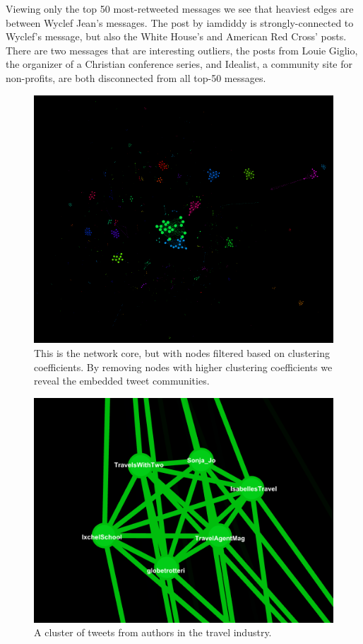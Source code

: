 \documentclass[a4paper, 11pt, titlepage]{article}
\begin{document}
Viewing only the top 50 most-retweeted messages we see that heaviest edges are between Wyclef Jean's messages.  The post by iamdiddy is strongly-connected to Wyclef's message, but also the White House's and American Red Cross' posts.  There are two messages that are interesting outliers, the posts from Louie Giglio, the organizer of a Christian conference series, and Idealist, a community site for non-profits, are both disconnected from all top-50 messages.

\begin{figure}[h]
\centering
\label{fig:rt_net_core_clusters}
\includegraphics[width=120mm]{../figures/rt_net_core_clusters}
\caption{This is the network core, but with nodes filtered based on clustering coefficients.  By removing nodes with higher clustering coefficients we reveal the embedded tweet communities.}
\end{figure}

\begin{figure}[h]
\centering
\label{fig:rt_net_travel}
\includegraphics[width=120mm]{../figures/rt_net_travel}
\caption{A cluster of tweets from authors in the travel industry.}
\end{figure}
\end{document}
